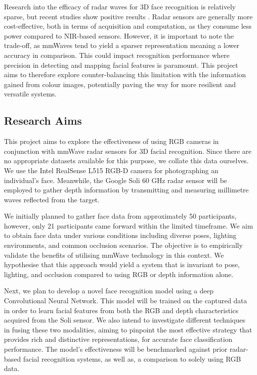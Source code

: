\documentclass{mpaper}
\begin{document}
Research into the efficacy of radar waves for 3D face recognition is relatively sparse, but recent studies show positive results \cite{hof2020face, lim2020dnn,kim2020face, pho2021radar,challa2021face}. Radar sensors are generally more cost-effective, both in terms of acquisition and computation, as they consume less power compared to NIR-based sensors. However, it is important to note the trade-off, as mmWaves tend to yield a sparser representation meaning a lower accuracy in comparison. This could impact recognition performance where precision in detecting and mapping facial features is paramount. This project aims to therefore explore counter-balancing this limitation with the information gained from colour images, potentially paving the way for more resilient and versatile systems. 


\subsection{Research Aims}
This project aims to explore the effectiveness of using RGB cameras in conjunction with mmWave radar sensors for 3D facial recognition. Since there are no appropriate datasets available for this purpose, we collate this data ourselves. We use the Intel RealSense L515 RGB-D camera \cite{intel-l515} for photographing an individual's face. Meanwhile, the Google Soli 60 GHz radar sensor \cite{lien2016soli} will be employed to gather depth information by transmitting and measuring millimetre waves reflected from the target.

We initially planned to gather face data from approximately 50 participants, however, only 21 participants came forward within the limited timeframe. We aim to obtain face data under various conditions including diverse poses, lighting environments, and common occlusion scenarios. The objective is to empirically validate the benefits of utilising mmWave technology in this context. We hypothesise that this approach would yield a system that is invariant to pose, lighting, and occlusion compared to using RGB or depth information alone.

Next, we plan to develop a novel face recognition model using a deep Convolutional Neural Network. This model will be trained on the captured data in order to learn facial features from both the RGB and depth characteristics acquired from the Soli sensor. We also intend to investigate different techniques in fusing these two modalities, aiming to pinpoint the most effective strategy that provides rich and distinctive representations, for accurate face classification performance. The model's effectiveness will be benchmarked against prior radar-based facial recognition systems, as well as, a comparison to solely using RGB data.
\end{document}
